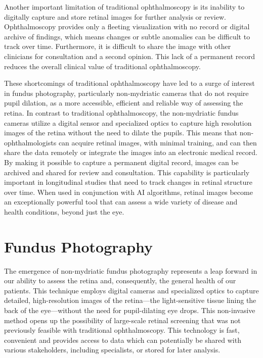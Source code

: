 \documentclass[
  Letterpaper,
]{scrbook}
\begin{document}
Another important limitation of traditional ophthalmoscopy is its
inability to digitally capture and store retinal images for further
analysis or review. Ophthalmoscopy provides only a fleeting
visualization with no record or digital archive of findings, which means
changes or subtle anomalies can be difficult to track over time.
Furthermore, it is difficult to share the image with other clinicians
for consultation and a second opinion. This lack of a permanent record
reduces the overall clinical value of traditional ophthalmoscopy.

These shortcomings of traditional ophthalmoscopy have led to a surge of
interest in fundus photography, particularly non-mydriatic cameras that
do not require pupil dilation, as a more accessible, efficient and
reliable way of assessing the retina. In contrast to traditional
ophthalmoscopy, the non-mydriatic fundus cameras utilize a digital
sensor and specialized optics to capture high resolution images of the
retina without the need to dilate the pupils. This means that
non-ophthalmologists can acquire retinal images, with minimal training,
and can then share the data remotely or integrate the images into an
electronic medical record. By making it possible to capture a permanent
digital record, images can be archived and shared for review and
consultation. This capability is particularly important in longitudinal
studies that need to track changes in retinal structure over time. When
used in conjunction with AI algorithms, retinal images become an
exceptionally powerful tool that can assess a wide variety of disease
and health conditions, beyond just the eye.

\section{Fundus Photography}\label{fundus-photography}

The emergence of non-mydriatic fundus photography represents a leap
forward in our ability to assess the retina and, consequently, the
general health of our patients. This technique employs digital cameras
and specialized optics to capture detailed, high-resolution images of
the retina---the light-sensitive tissue lining the back of the
eye---without the need for pupil-dilating eye drops. This non-invasive
method opens up the possibility of large-scale retinal screening that
was not previously feasible with traditional ophthalmoscopy. This
technology is fast, convenient and provides access to data which can
potentially be shared with various stakeholders, including specialists,
or stored for later analysis.
\end{document}
